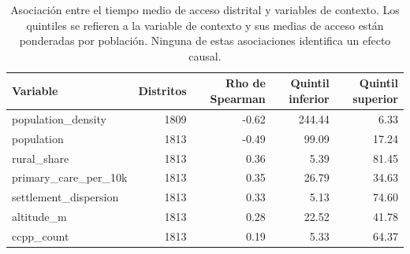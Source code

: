 \begin{table}[htbp]
\caption{Asociación entre el tiempo medio de acceso distrital y variables de contexto. Los quintiles se refieren a la variable de contexto y sus medias de acceso están ponderadas por población. Ninguna de estas asociaciones identifica un efecto causal.}
\label{tab:analisis-cruzado}
\footnotesize
\begin{tabular}{lrrrr}
\toprule
Variable & Distritos & Rho de Spearman & Quintil inferior & Quintil superior \\
\midrule
population\_density & 1809 & -0.62 & 244.44 & 6.33 \\
population & 1813 & -0.49 & 99.09 & 17.24 \\
rural\_share & 1813 & 0.36 & 5.39 & 81.45 \\
primary\_care\_per\_10k & 1813 & 0.35 & 26.79 & 34.63 \\
settlement\_dispersion & 1813 & 0.33 & 5.13 & 74.60 \\
altitude\_m & 1813 & 0.28 & 22.52 & 41.78 \\
ccpp\_count & 1813 & 0.19 & 5.33 & 64.37 \\
\bottomrule
\end{tabular}
\end{table}
